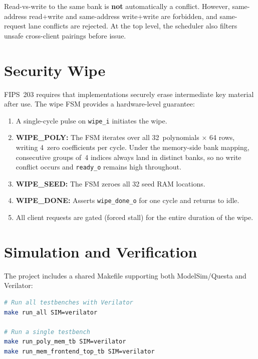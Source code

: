 \documentclass[11pt,letterpaper]{article}
\begin{document}
Read-vs-write to the same bank is \textbf{not} automatically a conflict.
However, same-address read+write and same-address write+write are forbidden,
and same-request lane conflicts are rejected. At the top level, the scheduler
also filters unsafe cross-client pairings before issue.

\section{Security Wipe}
\label{sec:wipe}

FIPS~203 requires that implementations securely erase intermediate
key material after use. The wipe FSM provides a hardware-level guarantee:

\begin{enumerate}
  \item A single-cycle pulse on \texttt{wipe\_i} initiates the wipe.
  \item \textbf{WIPE\_POLY:} The FSM iterates over all 32~polynomials
    $\times$ 64 rows, writing 4~zero coefficients per cycle. Under the
    memory-side bank mapping, consecutive groups of~4 indices always land
    in distinct banks, so no write conflict occurs and \texttt{ready\_o}
    remains high throughout.
  \item \textbf{WIPE\_SEED:} The FSM zeroes all 32 seed RAM locations.
  \item \textbf{WIPE\_DONE:} Asserts \texttt{wipe\_done\_o} for one cycle
    and returns to idle.
  \item All client requests are gated (forced stall) for the entire
    duration of the wipe.
\end{enumerate}

\section{Simulation and Verification}
\label{sec:sim}

The project includes a shared Makefile supporting both ModelSim/Questa
and Verilator:

\begin{lstlisting}[language=bash, style=sv, caption={Running testbenches.}]
# Run all testbenches with Verilator
make run_all SIM=verilator

# Run a single testbench
make run_poly_mem_tb SIM=verilator
make run_mem_frontend_top_tb SIM=verilator
\end{lstlisting}
\end{document}
